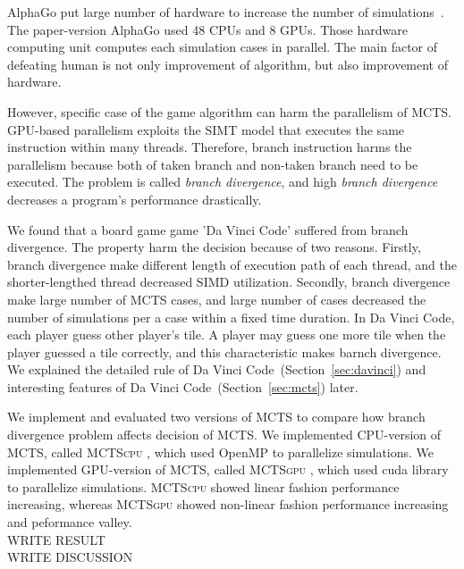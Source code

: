 \documentclass[conference]{IEEEtran}
\newcommand{\cpu} {\textsc{MCTScpu} }
\newcommand{\gpu} {\textsc{MCTSgpu} }
\begin{document}
AlphaGo put large number of hardware to increase the number of simulations~\cite{silver2016mastering_alphago}.
The paper-version AlphaGo used 48 CPUs and 8 GPUs.
Those hardware computing unit computes each simulation cases in parallel.
The main factor of defeating human is not only improvement of algorithm, but also improvement of hardware.

However, specific case of the game algorithm can harm the parallelism of MCTS.
GPU-based parallelism exploits the SIMT model that executes the same instruction within many threads.
Therefore, branch instruction harms the parallelism because both of taken branch and non-taken branch need to be executed.
The problem is called \textit{branch divergence}, and high \textit{branch divergence} decreases a program's performance drastically.

We found that a board game game 'Da Vinci Code' suffered from branch divergence.
The property harm the decision because of two reasons.
Firstly, branch divergence make different length of execution path of each thread, and the shorter-lengthed thread decreased SIMD utilization.
Secondly, branch divergence make large number of MCTS cases, and large number of cases decreased the number of simulations per a case within a fixed time duration.
In Da Vinci Code, each player guess other player's tile.
A player may guess one more tile when the player guessed a tile correctly, and this characteristic makes barnch divergence.
We explained the detailed rule of Da Vinci Code~(Section~\ref{sec:davinci}) and interesting features of Da Vinci Code~(Section~\ref{sec:mcts}) later.


We implement and evaluated two versions of MCTS to compare how branch divergence problem affects decision of MCTS.
We implemented CPU-version of MCTS, called \cpu, which used OpenMP to parallelize simulations.
We implemented GPU-version of MCTS, called \gpu, which used cuda library to parallelize simulations.
\cpu showed linear fashion performance increasing, whereas \gpu showed non-linear fashion performance increasing and peformance valley.
\\WRITE RESULT
\\WRITE DISCUSSION
\end{document}
